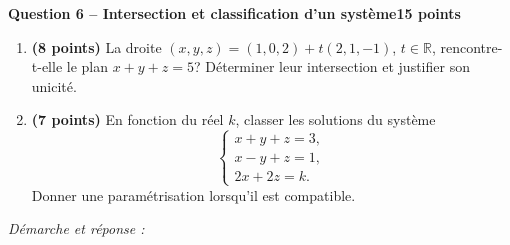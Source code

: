 \documentclass[11pt,a4paper]{article}
\begin{document}
\newpage
{\large\bfseries Question 6 -- Intersection et classification d’un système}\hfill\textbf{15 points}\par
\begin{enumerate}
\item \textbf{(8 points)} La droite \((x,y,z)=(1,0,2)+t(2,1,-1)\), \(t\in\mathbb R\), rencontre-t-elle le plan \(x+y+z=5\)? Déterminer leur intersection et justifier son unicité.
\item \textbf{(7 points)} En fonction du réel \(k\), classer les solutions du système \[\begin{cases}x+y+z=3,\\x-y+z=1,\\2x+2z=k.\end{cases}\] Donner une paramétrisation lorsqu’il est compatible.
\end{enumerate}
\vspace{3mm}\textit{Démarche et réponse :}\par\vfill
\end{document}
